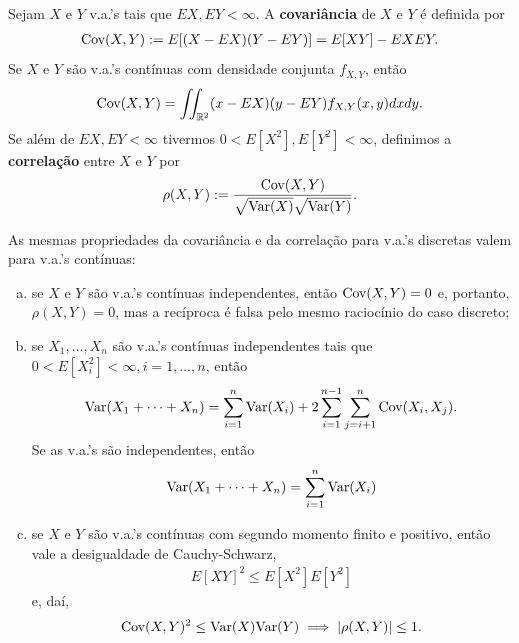 \documentclass[../Notas.tex]{subfiles}
\begin{document}
\begin{definition}
Sejam $X$ e $Y$ v.a.'s tais que $EX, EY < \infty$. A \textbf{covariância} de $X$ e $Y$ é definida por
\begin{align*}
    \text{Cov}(X,Y) := E[(X-EX)(Y-EY)] = E[XY] - EXEY.
\end{align*}
Se $X$ e $Y$ são v.a.'s contínuas com densidade conjunta $f_{X,Y}$, então
\begin{align*}
    \text{Cov}(X,Y) = \iint_{\mathbb{R}^2} (x-EX)(y-EY)f_{X,Y}(x,y) dxdy.
\end{align*}
Se além de $EX, EY < \infty$ tivermos $0 < E[X^2], E[Y^2] < \infty$, definimos a \textbf{correlação} entre $X$ e $Y$ por
\begin{align*}
    \rho(X,Y) := \frac{\text{Cov}(X,Y)}{\sqrt{\text{Var}(X)}\sqrt{\text{Var}(Y)}}.
\end{align*}
\end{definition}

\begin{remark}
As mesmas propriedades da covariância e da correlação para v.a.'s discretas valem para v.a.'s contínuas: 
\begin{enumerate}[(a)]
    \item se $X$ e $Y$ são v.a.'s contínuas independentes, então $\text{Cov}(X,Y) = 0$ e, portanto, $\rho(X,Y) = 0$, mas a recíproca é falsa pelo mesmo raciocínio do caso discreto;
    \item se $X_1, \dots, X_n$ são v.a.'s contínuas independentes tais que $0 < E[X_i^2] < \infty, i = 1, \dots, n$, então
    \begin{align*}
        \text{Var}(X_1 + \cdots + X_n) = \sum_{i=1}^n \text{Var}(X_i) + 2\sum_{i=1}^{n-1}\sum_{j=i+1}^{n}\text{Cov}(X_i, X_j).
    \end{align*}
    Se as v.a.'s são independentes, então
    \begin{align*}
        \text{Var}(X_1 + \cdots + X_n) = \sum_{i=1}^n \text{Var}(X_i)
    \end{align*}
    \item se $X$ e $Y$ são v.a.'s contínuas com segundo momento finito e positivo, então vale a desigualdade de Cauchy-Schwarz,
    \begin{align*}
        E[XY]^2 \leq E[X^2]E[Y^2]
    \end{align*}
    e, daí,
    \begin{align*}
        \text{Cov}(X,Y)^2 \leq \text{Var}(X)\text{Var}(Y) \implies |\rho(X,Y)| \leq 1.
    \end{align*}
\end{enumerate}
\end{remark}
\end{document}
